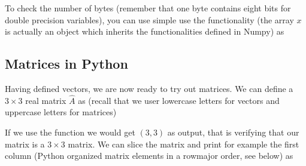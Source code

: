 \documentclass[letterpaper,10pt,english]{sphinxmanual}
\begin{document}
To check the number of bytes (remember that one byte contains eight bits for double precision variables), you can use simple use the  functionality (the array \(x\) is actually an object which inherits the functionalities defined in Numpy) as

\begin{sphinxVerbatim}[commandchars=\\\{\}]
   
  \PYG{p}{[}  \PYG{p}{]}
\end{sphinxVerbatim}


\subsection{Matrices in Python}
\label{\detokenize{chapter3:matrices-in-python}}
Having defined vectors, we are now ready to try out matrices. We can
define a \(3 \times 3 \) real matrix \(\hat{A}\) as (recall that we user
lowercase letters for vectors and uppercase letters for matrices)

\begin{sphinxVerbatim}[commandchars=\\\{\}]
   
  \PYG{p}{[} \PYG{p}{[}  \PYG{p}{]} \PYG{p}{[}  \PYG{p}{]} \PYG{p}{[}  \PYG{p}{]} \PYG{p}{]}
\end{sphinxVerbatim}

If we use the  function we would get \((3, 3)\) as output, that is verifying that our matrix is a \(3\times 3\) matrix. We can slice the matrix and print for example the first column (Python organized matrix elements in a row\sphinxhyphen{}major order, see below) as
\end{document}
